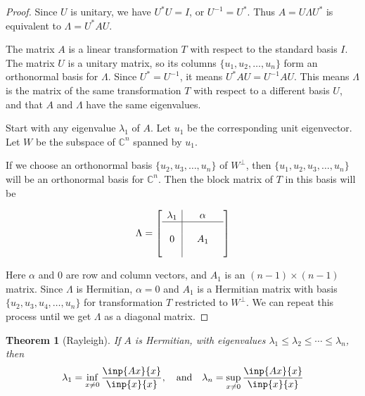 \documentclass[twoside]{article}
\newcommand*\adj[1]{#1^*}
\theoremstyle{plain}
\newtheorem{theorem}{Theorem}
\theoremstyle{definition}
\theoremstyle{remark}
\begin{document}
\begin{proof} 

Since \(U\) is unitary, we have \(\adj{U} U = I\), or \(U^{-1} = \adj{U}\). Thus  \(A = U \Lambda \adj{U}\) is equivalent to \(\Lambda = \adj{U} A U\).


The matrix \(A\) is a linear transformation \(T\) with respect to the standard basis \(I\). The matrix \(U\) is a unitary matrix, so its columns \(\{u_1, u_2, \ldots , u_n\}\) form an orthonormal basis for \(\Lambda\). Since \(\adj{U} = U^{-1}\), it means \(\adj{U} A U = U^{-1}AU\). This means \(\Lambda\) is the matrix of the same transformation \(T\) with respect to a different basis \(U\), and that \(A\) and \(\Lambda\) have the same eigenvalues.

Start with any eigenvalue \(\lambda_1\) of \(A\). Let \(u_1\) be the corresponding unit eigenvector. Let \(W\) be the subspace of \(\mathbb{C}^n\) spanned by \(u_1\).

If we choose an orthonormal basis \(\{u_2, u_3, \ldots , u_n\}\) of \(W^\perp\), then \(\{u_1, u_2, u_3, \ldots , u_n\}\) will be an orthonormal basis for \(\mathbb{C}^n\).  Then the block matrix of \(T\) in this basis will be 

\[\Lambda = \left[\begin{array}{c|ccc}
 \lambda_1 & &\alpha& \\ 
\hline \\
0 & & A_1& \\ \\ \end{array} \right]\]

Here \(\alpha\) and \(0\) are row and column vectors, and \(A_1\) is an \((n-1) \times (n-1)\) matrix. 
Since \(\Lambda\) is Hermitian, \(\alpha = 0\) and \(A_1\) is a Hermitian matrix with basis \(\{u_2, u_3, u_4 , \ldots , u_n\}\) for transformation \(T\) restricted to \(W^\perp\). We can repeat this process until we get \(\Lambda\) as a diagonal matrix. 
\end{proof}

\begin{theorem}[Rayleigh] If \(A\) is Hermitian, with eigenvalues \(\lambda_1 \le \lambda_2 \le \cdots \le \lambda_n\), then 
\[\lambda_1 = \inf _{x \ne 0} \frac{\inp{Ax}{x}}{\inp{x}{x}}, \quad \text{and} \quad  \lambda_n = \sup_{x \ne 0} \frac{\inp{Ax}{x}}{\inp{x}{x}}\] \end{theorem}
\end{document}
